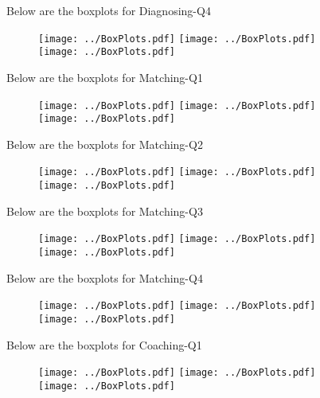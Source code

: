 \documentclass[11pt]{extarticle} %
\begin{document}
\newpage
Below are the boxplots for Diagnosing-Q4
\begin{figure}[H]
\centering 
\texttt{[image: ../BoxPlots.pdf]} 
\texttt{[image: ../BoxPlots.pdf]} \\
\texttt{[image: ../BoxPlots.pdf]} \\
\end{figure}

\newpage
Below are the boxplots for Matching-Q1
\begin{figure}[H]
\centering 
\texttt{[image: ../BoxPlots.pdf]} 
\texttt{[image: ../BoxPlots.pdf]} \\
\texttt{[image: ../BoxPlots.pdf]} \\
\end{figure}

\newpage
Below are the boxplots for Matching-Q2
\begin{figure}[H]
\centering 
\texttt{[image: ../BoxPlots.pdf]} 
\texttt{[image: ../BoxPlots.pdf]} \\
\texttt{[image: ../BoxPlots.pdf]} \\
\end{figure}

\newpage
Below are the boxplots for Matching-Q3
\begin{figure}[H]
\centering 
\texttt{[image: ../BoxPlots.pdf]} 
\texttt{[image: ../BoxPlots.pdf]} \\
\texttt{[image: ../BoxPlots.pdf]} \\
\end{figure}

\newpage
Below are the boxplots for Matching-Q4
\begin{figure}[H]
\centering 
\texttt{[image: ../BoxPlots.pdf]} 
\texttt{[image: ../BoxPlots.pdf]} \\
\texttt{[image: ../BoxPlots.pdf]} \\
\end{figure}

\newpage
Below are the boxplots for Coaching-Q1
\begin{figure}[H]
\centering 
\texttt{[image: ../BoxPlots.pdf]} 
\texttt{[image: ../BoxPlots.pdf]} \\
\texttt{[image: ../BoxPlots.pdf]} \\
\end{figure}
\end{document}
